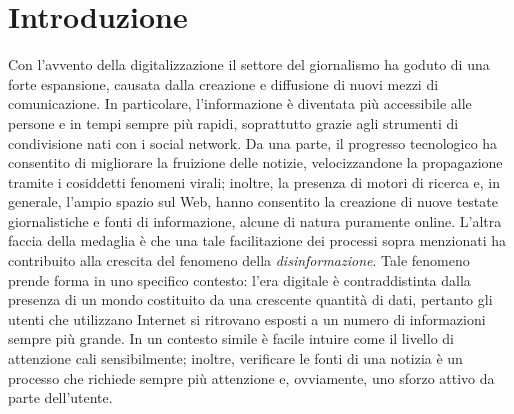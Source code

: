 \documentclass[12pt]{report}
\theoremstyle{definition}
\begin{document}
\chapter*{Introduzione}
  
\onehalfspacing
Con l'avvento della digitalizzazione il settore del giornalismo ha goduto di una forte espansione, causata dalla creazione e diffusione di nuovi mezzi di comunicazione. In particolare, l'informazione è diventata più accessibile alle persone e in tempi sempre più rapidi, soprattutto grazie agli strumenti di condivisione nati con i social network.
Da una parte, il progresso tecnologico ha consentito di migliorare la fruizione delle notizie, velocizzandone la propagazione tramite i cosiddetti fenomeni virali; inoltre, la presenza di motori di ricerca e, in generale, l'ampio spazio sul Web, hanno consentito la creazione di nuove testate giornalistiche e fonti di informazione, alcune di natura puramente online.
L'altra faccia della medaglia è che una tale facilitazione dei processi sopra menzionati ha contribuito alla crescita del fenomeno della \textit{disinformazione}.
Tale fenomeno prende forma in uno specifico contesto: l'era digitale è contraddistinta dalla presenza di un mondo costituito da una crescente quantità di dati, pertanto gli utenti che utilizzano Internet si ritrovano esposti a un numero di informazioni sempre più grande.
In un contesto simile è facile intuire come il livello di attenzione cali sensibilmente; inoltre, verificare le fonti di una notizia è un processo che richiede sempre più attenzione e, ovviamente, uno sforzo attivo da parte dell'utente.
\end{document}
